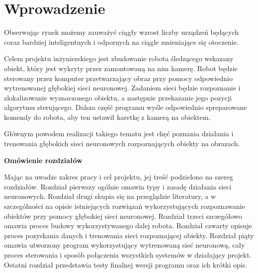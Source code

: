 \section{Wprowadzenie}

Obserwując rynek możemy zauważyć ciągły wzrost liczby urządzeń będących coraz bardziej inteligentnych
i odpornych na ciągle zmieniające się otoczenie.

Celem projektu inżynierskiego jest zbudowanie robota śledzącego wskazany obiekt, który jest wykryty przez zamontowaną na nim kamerę.
Robot będzie sterowany przez komputer przetwarzający obraz przy pomocy odpowiednio wytrenowanej
głębokiej sieci neuronowej. Zadaniem sieci będzie rozpoznanie i zlokalizowanie wyznaczonego obiektu, 
a następnie przekazanie jego pozycji algorytmu sterującego. Dalsza część programu
wyśle odpowiednio spreparowane komendy do robota, aby ten ustawił karetkę z kamerą na obiektem.

Głównym powodem realizacji takiego tematu jest chęć poznania działania i trenowania głębokich sieci 
neuronowych rozpoznających obiekty na obrazach.

\textbf{Omówienie rozdziałów}

Mając na uwadze zakres pracy i cel projektu, jej treść podzielono na szereg rozdziałów. 
Rozdział pierwszy ogólnie omawia typy i zasadę działania sieci neuronowych. 
Rozdział drugi skupia się na przeglądzie literatury, a w szczególności na opisie istniejących rozwiązań
wykorzystujących rozpoznawanie obiektów przy pomocy głębokiej sieci neuronowej.
Rozdział trzeci szczegółowo omawia proces budowy wykorzystywanego dalej robota.
Rozdział czwarty opisuje proces pozyskania danych i trenowania sieci rozpoznającej obiekty.
Rozdział piąty omawia utworzony program wykorzystujący wytrenowaną sieć neuronową, cały proces sterowania i 
sposób połączenia wszystkich systemów w działający projekt.
Ostatni rozdział przedstawia testy finalnej wersji programu oraz ich krótki opis. 

